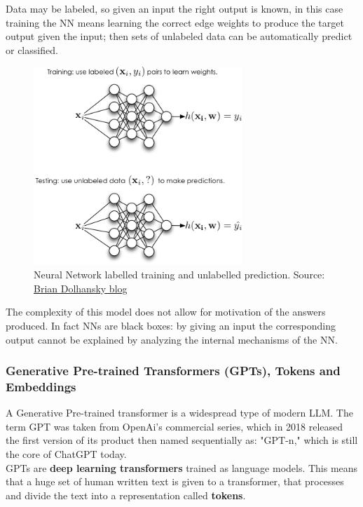 \documentclass[12pt]{article}
\begin{document}
Data may be labeled, so given an input the right output is known, in this case training the NN means learning the correct edge weights to produce the target output given the input; then sets of unlabeled data can be automatically predict or classified.
    \begin{figure}[H]
    \centering
            \includegraphics[width=0.7\textwidth]{trainingNN.png}
    \caption[Neural Network labelled training and unlabelled prediction]{Neural Network labelled training and unlabelled prediction. Source: \href{https://www.briandolhansky.com/blog/artificial-neural-networks-linear-regression-part-1}{Brian Dolhansky blog}}
    \end{figure}

The complexity of this model does not allow for motivation of the answers produced. In fact NNs are black boxes: by giving an input the corresponding output cannot be explained by analyzing the internal mechanisms of the NN.

        \subsubsection{Generative Pre-trained Transformers (GPTs), Tokens and Embeddings}
A Generative Pre-trained transformer is a widespread type of modern LLM. The term GPT was taken from OpenAi's commercial series, which in 2018 released the first version of its product then named sequentially as: "GPT-n," which is still the core of ChatGPT today.\\
GPTs are \textbf{deep learning transformers} trained as language models. This means that a huge set of human written text is given to a transformer, that processes and divide the text into a representation called \textbf{tokens}.\\
\end{document}

